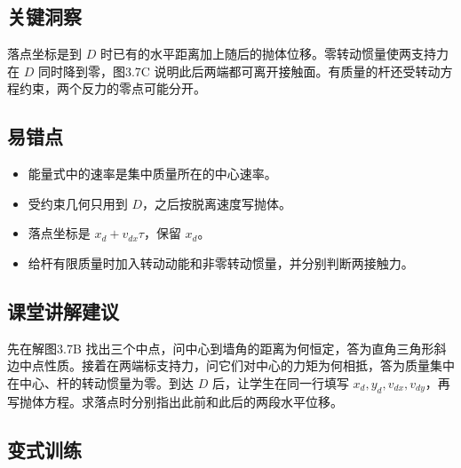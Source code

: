\documentclass[UTF8,fontset=fandol,a4paper,11pt]{ctexart}
\begin{document}
\subsection*{关键洞察}

落点坐标是到 $D$ 时已有的水平距离加上随后的抛体位移。零转动惯量使两支持力在 $D$ 同时降到零，图3.7C 说明此后两端都可离开接触面。有质量的杆还受转动方程约束，两个反力的零点可能分开。



\subsection*{易错点}

\begin{itemize}
\item 能量式中的速率是集中质量所在的中心速率。
\item 受约束几何只用到 $D$，之后按脱离速度写抛体。
\item 落点坐标是 $x_d+v_{dx}\tau$，保留 $x_d$。
\item 给杆有限质量时加入转动动能和非零转动惯量，并分别判断两接触力。
\end{itemize}



\subsection*{课堂讲解建议}

先在解图3.7B 找出三个中点，问中心到墙角的距离为何恒定，答为直角三角形斜边中点性质。接着在两端标支持力，问它们对中心的力矩为何相抵，答为质量集中在中心、杆的转动惯量为零。到达 $D$ 后，让学生在同一行填写 $x_d,y_d,v_{dx},v_{dy}$，再写抛体方程。求落点时分别指出此前和此后的两段水平位移。



\subsection*{变式训练}
\end{document}
